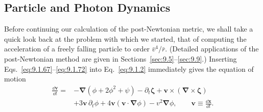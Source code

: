 
\subsection{Particle and Photon Dynamics}\label{sec:9.2}

Before continuing our calculation of the post-Newtonian metric, we shall
take a quick look back at the problem with which we started, that of
computing the acceleration of a freely falling particle to order
\(\bar v^4/\bar r\). (Detailed applications of the post-Newtonian method
are given in Sections~\ref{sec:9.5}--\ref{sec:9.9}.) Inserting
Eqs.~\eqref{eq:9.1.67}--\eqref{eq:9.1.72} into Eq.~\eqref{eq:9.1.2}
immediately gives the equation of motion
\begin{equation}
  \begin{split}
  \frac{\dd\mathbf v}{\dd t}={}&
  -\boldsymbol\nabla(\phi+2\phi^2+\psi)
  -\partial_t\boldsymbol\zeta
  +\mathbf v\times(\boldsymbol\nabla\times\boldsymbol\zeta)\\
  &+3\mathbf v\,\partial_t\phi
  +4\mathbf v(\mathbf v\cdot\boldsymbol\nabla\phi)
  -v^2\boldsymbol\nabla\phi,
  \qquad
  \mathbf v\equiv\frac{\dd\mathbf x}{\dd t}.
  \end{split}
  \tag{9.2.1}\label{eq:9.2.1}
\end{equation}

